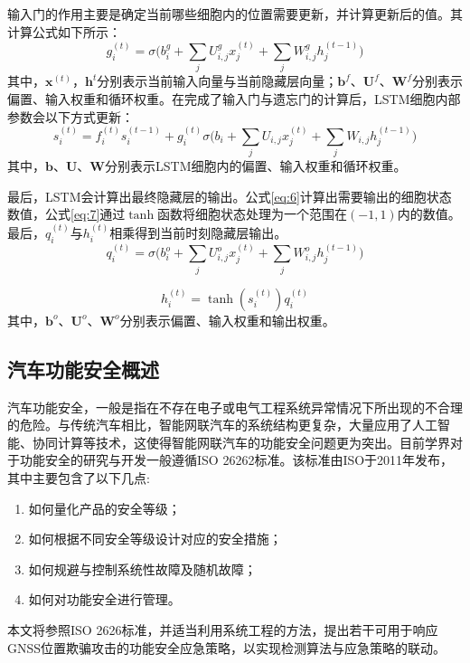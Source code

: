 输入门的作用主要是确定当前哪些细胞内的位置需要更新，并计算更新后的值。其计算公式如下所示：
\begin{equation}
    g_i^{(t)}=\sigma\bigg(b_i^g+\sum_jU_{i,j}^gx_j^{(t)}+\sum_jW_{i,j}^gh_j^{(t-1)}\bigg)
    \label{eq:4}
\end{equation}
其中，$\textbf{x}^{(t)}$，$\textbf{h}^t$分别表示当前输入向量与当前隐藏层向量；$\textbf{b}^f$、$\textbf{U}^f$、$\textbf{W}^f$分别表示偏置、输入权重和循环权重。在完成了输入门与遗忘门的计算后，LSTM细胞内部参数会以下方式更新：
\begin{equation}
    s_i^{(t)}=f_i^{(t)}s_i^{(t-1)}+g_i^{(t)}\sigma\bigg(b_i+\sum_jU_{i,j}x_j^{(t)}+\sum_jW_{i,j}h_j^{(t-1)}\bigg)
    \label{eq:5}
\end{equation}
其中，$\textbf{b}$、$\textbf{U}$、$\textbf{W}$分别表示LSTM细胞内的偏置、输入权重和循环权重。

最后，LSTM会计算出最终隐藏层的输出。公式\ref{eq:6}计算出需要输出的细胞状态数值，公式\ref{eq:7}通过$\tanh$函数将细胞状态处理为一个范围在$(-1,1)$内的数值。最后，$q_i^{(t)}$与$h_i^{(t)}$相乘得到当前时刻隐藏层输出。
\begin{equation}
    q_i^{(t)}=\sigma\bigg(b_i^o+\sum_jU^o_{i,j}x_j^{(t)}+\sum_jW_{i,j}^oh_j^{(t-1)}\bigg)
    \label{eq:6}
\end{equation}

\begin{equation}
    h_i^{(t)}=\tanh(s_i^{(t)})q_i^{(t)}
    \label{eq:7}
\end{equation}
其中，$\textbf{b}^o$、$\textbf{U}^o$、$\textbf{W}^o$分别表示偏置、输入权重和输出权重。

\subsection{汽车功能安全概述}
汽车功能安全，一般是指在不存在电子或电气工程系统异常情况下所出现的不合理的危险\cite{刘法旺2021自动驾驶系统功能安全与预期功能安全研究}。与传统汽车相比，智能网联汽车的系统结构更复杂，大量应用了人工智能、协同计算等技术，这使得智能网联汽车的功能安全问题更为突出。目前学界对于功能安全的研究与开发一般遵循ISO 26262标准。该标准由ISO于2011年发布，其中主要包含了以下几点\cite{iso_2018}:
\begin{enumerate}
    \item 如何量化产品的安全等级；
    \item 如何根据不同安全等级设计对应的安全措施；
    \item 如何规避与控制系统性故障及随机故障；
    \item 如何对功能安全进行管理。
\end{enumerate}
本文将参照ISO 2626标准，并适当利用系统工程的方法，提出若干可用于响应GNSS位置欺骗攻击的功能安全应急策略，以实现检测算法与应急策略的联动。

